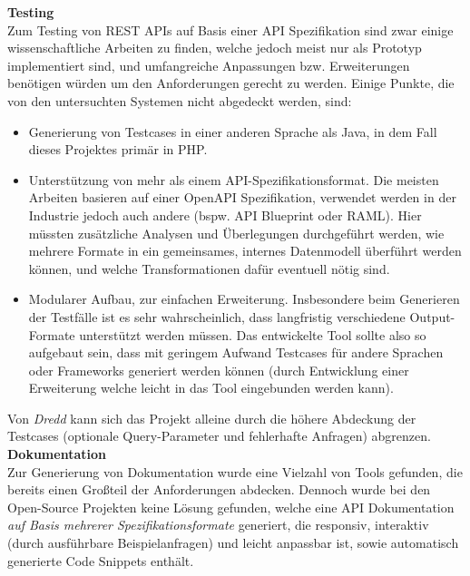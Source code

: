 \textbf{Testing}\\
Zum Testing von REST APIs auf Basis einer API Spezifikation sind zwar einige wissenschaftliche Arbeiten zu finden, welche jedoch meist nur als Prototyp implementiert sind, und umfangreiche Anpassungen bzw. Erweiterungen benötigen würden um den Anforderungen gerecht zu werden. Einige Punkte, die von den untersuchten Systemen nicht abgedeckt werden, sind:
\begin{itemize}
	\item Generierung von Testcases in einer anderen Sprache als Java, in dem Fall dieses Projektes primär in PHP.
	\item Unterstützung von mehr als einem API-Spezifikationsformat. Die meisten Arbeiten basieren auf einer OpenAPI Spezifikation, verwendet werden in der Industrie jedoch auch andere (bspw. API Blueprint oder RAML). Hier müssten zusätzliche Analysen und Überlegungen durchgeführt werden, wie mehrere Formate in ein gemeinsames, internes Datenmodell überführt werden können, und welche Transformationen dafür eventuell nötig sind.
	\item Modularer Aufbau, zur einfachen Erweiterung. Insbesondere beim Generieren der Testfälle ist es sehr wahrscheinlich, dass langfristig verschiedene Output-Formate unterstützt werden müssen. Das entwickelte Tool sollte also so aufgebaut sein, dass mit geringem Aufwand Testcases für andere Sprachen oder Frameworks generiert werden können (durch Entwicklung einer Erweiterung welche leicht in das Tool eingebunden werden kann).
\end{itemize}
Von \emph{Dredd} kann sich das Projekt alleine durch die höhere Abdeckung der Testcases (optionale Query-Parameter und fehlerhafte Anfragen) abgrenzen.\\

\textbf{Dokumentation}\\
Zur Generierung von Dokumentation wurde eine Vielzahl von Tools gefunden, die bereits einen Großteil der Anforderungen abdecken. Dennoch wurde bei den Open-Source Projekten keine Lösung gefunden, welche eine API Dokumentation \emph{auf Basis mehrerer Spezifikationsformate} generiert, die responsiv, interaktiv (durch ausführbare Beispielanfragen) und leicht anpassbar ist, sowie automatisch generierte Code Snippets enthält.
